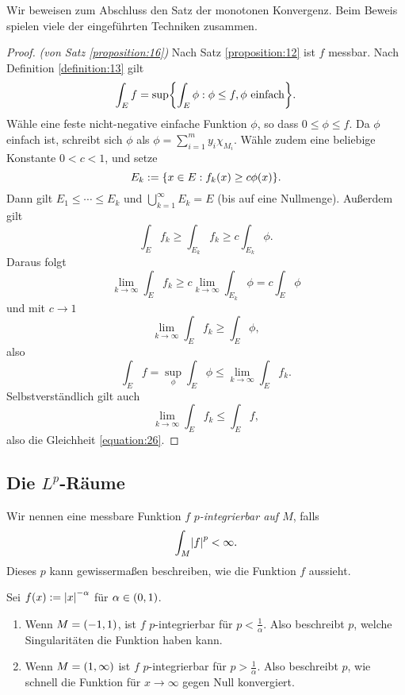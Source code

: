 Wir beweisen zum Abschluss den Satz der monotonen Konvergenz.
Beim Beweis spielen viele der eingeführten Techniken zusammen.

\begin{proof}
	\emph{(von Satz \ref{proposition:16})} Nach Satz \ref{proposition:12} ist \(f\) messbar.
	Nach Definition \ref{definition:13} gilt
	\[
		\int_E f = \sup\braces*{\int_E \phi : \phi \le f, \phi\text{ einfach}}.
	\]
	Wähle eine feste nicht-negative einfache Funktion \(\phi\), so dass \(0 \le \phi \le f\).
	Da \(\phi\) einfach ist, schreibt sich \(\phi\) als \(\phi = \sum_{i = 1}^m y_i \chi_{M_i}\).
	Wähle zudem eine beliebige Konstante \(0 < c < 1\), und setze
	\[
		E_k := \braces*{x \in E : f_k\parentheses*{x} \ge c\phi\parentheses*{x}}.
	\]
	Dann gilt \(E_1 \le \cdots \le E_k\) und \(\bigcup_{k = 1}^\infty E_k = E\) (bis auf eine Nullmenge).
	Außerdem gilt
	\begin{equation}
		\int_E f_k \ge \int_{E_k}f_k \ge c\int_{E_k}\phi.
	\end{equation}
	Daraus folgt
	\[
		\lim_{k \to \infty}\int_E f_k \ge c\lim_{k \to \infty}\int_{E_k}\phi = c\int_E \phi
	\]
	und mit \(c \to 1\)
	\[
		\lim_{k \to \infty}\int_E f_k \ge \int_E \phi,
	\]
	also
	\[
		\int_E f = \sup_\phi \int_E \phi \le \lim_{k \to \infty}\int_E f_k.
	\]
	Selbstverständlich gilt auch
	\[
		\lim_{k \to \infty}\int_E f_k \le \int_E f,
	\]
	also die Gleichheit \eqref{equation:26}.
\end{proof}


\subsection{Die $L^p$-Räume}

Wir nennen eine messbare Funktion \(f\) \emph{\(p\)-integrierbar auf \(M\)}, falls
\[
	\int_M \absolute*{f}^p < \infty.
\]
Dieses \(p\) kann gewissermaßen beschreiben, wie die Funktion \(f\) aussieht.

\begin{example}
	Sei \(f\parentheses*{x} := \absolute*{x}^{-\alpha}\) für \(\alpha \in \parentheses*{0, 1}\).
	\begin{enumerate}
		\item Wenn \(M = \parentheses*{-1, 1}\), ist \(f\) \(p\)-integrierbar für \(p < \frac{1}{\alpha}\).
		Also beschreibt \(p\), welche Singularitäten die Funktion haben kann.
		\item Wenn \(M = \parentheses*{1, \infty}\) ist \(f\) \(p\)-integrierbar für \(p > \frac{1}{\alpha}\).
		Also beschreibt \(p\), wie schnell die Funktion für \(x \to \infty\) gegen Null konvergiert.
	\end{enumerate}
\end{example}

